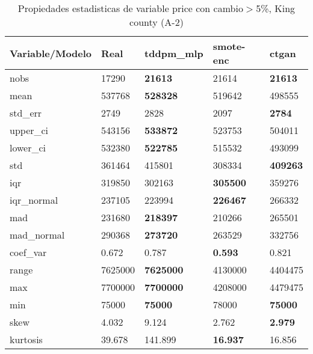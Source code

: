 \begin{table}[H]
\centering
\fontsize{8}{14}\selectfont
\caption{Propiedades estadisticas de variable price con cambio\ensuremath{>}5\%, King county (A-2)}
\label{table-stats-king county-a-2-price-short}
\begin{tabular}{|l|m{10em}|m{10em}|m{10em}|m{10em}|}
\hline
 \rowcolor[gray]{0.8}
Variable/Modelo & Real & tddpm\_mlp & smote-enc & ctgan \\
\hline nobs & 17290 & \bfseries 21613 & \cellcolor[rgb]{0.9, 0.54, 0.52} 21614 & \bfseries 21613 \\
\hline mean & 537768 & \bfseries 528328 & 519642 & \cellcolor[rgb]{0.9, 0.54, 0.52} 498555 \\
\hline std\_err & 2749 & 2828 & \cellcolor[rgb]{0.9, 0.54, 0.52} 2097 & \bfseries 2784 \\
\hline upper\_ci & 543156 & \bfseries 533872 & 523753 & \cellcolor[rgb]{0.9, 0.54, 0.52} 504011 \\
\hline lower\_ci & 532380 & \bfseries 522785 & 515532 & \cellcolor[rgb]{0.9, 0.54, 0.52} 493099 \\
\hline std & 361464 & \cellcolor[rgb]{0.9, 0.54, 0.52} 415801 & 308334 & \bfseries 409263 \\
\hline iqr & 319850 & 302163 & \bfseries 305500 & \cellcolor[rgb]{0.9, 0.54, 0.52} 359276 \\
\hline iqr\_normal & 237105 & 223994 & \bfseries 226467 & \cellcolor[rgb]{0.9, 0.54, 0.52} 266332 \\
\hline mad & 231680 & \bfseries 218397 & 210266 & \cellcolor[rgb]{0.9, 0.54, 0.52} 265501 \\
\hline mad\_normal & 290368 & \bfseries 273720 & 263529 & \cellcolor[rgb]{0.9, 0.54, 0.52} 332756 \\
\hline coef\_var & 0.672 & 0.787 & \bfseries 0.593 & \cellcolor[rgb]{0.9, 0.54, 0.52} 0.821 \\
\hline range & 7625000 & \bfseries 7625000 & \cellcolor[rgb]{0.9, 0.54, 0.52} 4130000 & 4404475 \\
\hline max & 7700000 & \bfseries 7700000 & \cellcolor[rgb]{0.9, 0.54, 0.52} 4208000 & 4479475 \\
\hline min & 75000 & \bfseries 75000 & \cellcolor[rgb]{0.9, 0.54, 0.52} 78000 & \bfseries 75000 \\
\hline skew & 4.032 & \cellcolor[rgb]{0.9, 0.54, 0.52} 9.124 & 2.762 & \bfseries 2.979 \\
\hline kurtosis & 39.678 & \cellcolor[rgb]{0.9, 0.54, 0.52} 141.899 & \bfseries 16.937 & 16.856 \\

\end{tabular}
\end{table}
